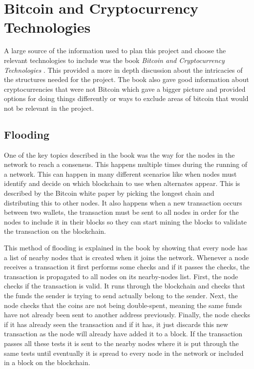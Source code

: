 \documentclass{l4proj}
\begin{document}
\section{Bitcoin and Cryptocurrency Technologies}
A large source of the information used to plan this project and choose the relevant technologies to include was the
book \emph{Bitcoin and Cryptocurrency Technologies} \citep{narayanan2016bitcoin}. This provided a more in depth discussion
about the intricacies of the structures needed for the project. The book also gave good information about cryptocurrencies
that were not Bitcoin which gave a bigger picture and provided options for doing things differently or ways to 
exclude areas of bitcoin that would not be relevant in the project.

\subsection{Flooding}
One of the key topics described in the book was the way for the nodes in the network to reach a consensus. This happens
multiple times during the running of a network. This can happen in many different scenarios like when 
nodes must identify and decide on which blockchain to use when alternates appear. This is described by the Bitcoin white 
paper by picking the longest chain and distributing this to other nodes. It also happens when a new transaction occurs 
between two wallets, the transaction must be sent to all nodes in order for the nodes to include it in their blocks so 
they can start mining the blocks to validate the transaction on the blockchain.

This method of flooding is explained in the book by showing that every node has a list of nearby nodes that is created
when it joins the network. Whenever a node receives a transaction it first performs some checks and if it passes the 
checks, the transaction is propagated to all nodes on its nearby-nodes list. First, the node checks if the transaction is
valid. It runs through the blockchain and checks that the funds the sender is trying to send actually belong to the sender.
Next, the node checks that the coins are not being double-spent, meaning the same funds have not already been sent to another
address previously. Finally, the node checks if it has already seen the transaction and if it has, it just discards this new
transaction as the node will already have added it to a block. If the transaction passes all these tests it is sent to the
nearby nodes where it is put through the same tests until eventually it is spread to every node in the network or included
in a block on the blockchain.
\end{document}

